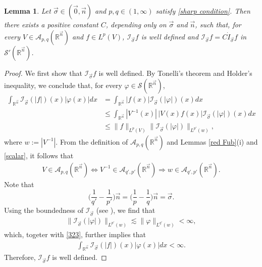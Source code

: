 \documentclass[11pt, reqno]{amsart}
\newtheorem{lemma}[theorem]{Lemma}
\theoremstyle{definition}
\theoremstyle{remark}
\numberwithin{equation}{section}
\newcommand{\A}{\mathscr A}
\newcommand{\R}{\mathbb R}
\newcommand{\vn}{\vec n}
\begin{document}
\begin{lemma} \label{8.19y}
Let $\vec\sigma\in (\vec 0,\vec n)$ and $p,q\in(1,\infty)$ satisfy \eqref{sharp condition}.
Then there exists a positive constant $C$,
depending only on $\vec\sigma$ and $\vn$, such that,
for every $V\in \A_{p,q}(\R^{\vn})$ and $f\in L^p(V)$,
$\mathscr I_{\vec\sigma} f$ is well defined and
$\mathscr I_{\vec\sigma} f= C \dot I_{\vec\sigma} f$
in $\mathscr S'(\R^{\vn})$.
\end{lemma}

\begin{proof}
We first show that $\mathscr I_{\vec\sigma} f$ is well defined.
By Tonelli's theorem and Holder's inequality, we conclude that, for every $\varphi\in \mathscr S(\R^{\vn})$,
\begin{equation} \label{323}
\begin{split}
\int_{\mathbb R^{\vec n}} \mathscr I_{\vec\sigma} (|f|)(x) |\varphi(x)| dx
&= \int_{\mathbb R^{\vec n}} |f(x)| \mathscr I_{\vec\sigma} (|\varphi|)(x)  dx \\
&\leq \int_{\mathbb R^{\vec n}} |V^{-1}(x)|\,|V(x)f(x)| \mathscr  I_{\vec\sigma} (|\varphi|)(x) dx \\
&\leq \|f\|_{L^p(V)} \| \mathscr I_{\vec\sigma} (|\varphi|) \|_{L^{p'}(w)},
\end{split}
\end{equation}
where $w:=|V^{-1}|$.
From the definition of $\A_{p,q}(\R^{\vn})$
and Lemmas \ref{red Fub}(i) and \ref{scalar}, it follows that
\begin{align*}
V\in \A_{p,q}(\R^{\vn})
\Longleftrightarrow V^{-1}\in \A_{q',p'}(\R^{\vn})
\Longrightarrow w\in \A_{q',p'}(\mathbb R^{\vec n}).
\end{align*}
Note that
$$
\Bigg(\frac 1{q'}-\frac 1{p'}\Bigg) \vec n
=\Bigg(\frac 1p-\frac 1q\Bigg) \vec n
=\vec \sigma.
$$
Using the boundedness of $\mathscr I_{\vec\sigma}$ (see \cite[Theorem 5]{SW17}), we find that
\begin{align*}
\| \mathscr I_{\vec\sigma} (|\varphi|) \|_{L^{p'}(w)}
\lesssim \|\varphi\|_{L^{q'}(w)} <\infty,
\end{align*}
which, togeter with \eqref{323}, further implies that
\begin{align} \label{bound}
\int_{\mathbb R^{\vec n}} \mathscr I_{\vec\sigma} (|f|)(x) |\varphi(x)| dx <\infty.
\end{align}
Therefore, $\mathscr I_{\vec\sigma} f$ is well defined.


\end{proof}
\end{document}

